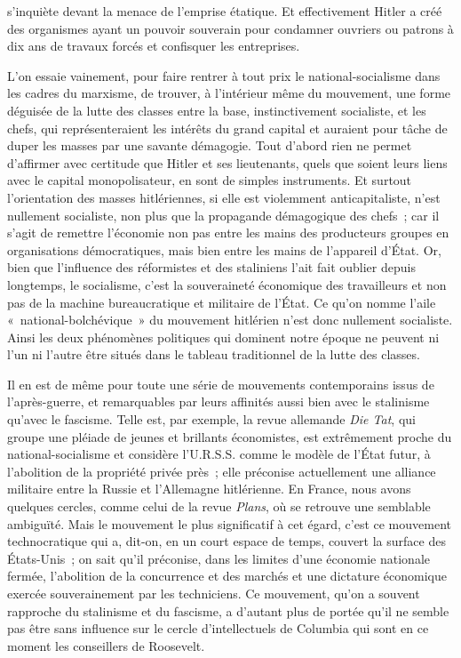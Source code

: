 \documentclass[french,twoside]{book} %
\begin{document}
s'inquiète devant la menace de l'emprise étatique. Et effectivement Hitler a créé des organismes ayant un pouvoir souverain pour condamner ouvriers ou patrons à dix ans de travaux forcés et confisquer les entreprises.\par
L'on essaie vainement, pour faire rentrer à tout prix le national-socialisme dans les cadres du marxisme, de trouver, à l'intérieur même du mouvement, une forme déguisée de la lutte des classes entre la base, instinctivement socialiste, et les chefs, qui représenteraient les intérêts du grand capital et auraient pour tâche de duper les masses par une savante démagogie. Tout d'abord rien ne permet d'affirmer avec certitude que Hitler et ses lieutenants, quels que soient leurs liens avec le capital monopolisateur, en sont de simples instruments. Et surtout l'orientation des masses hitlériennes, si elle est violemment anticapitaliste, n'est nullement socialiste, non plus que la propagande démagogique des chefs ; car il s'agit de remettre l'économie non pas entre les mains des producteurs groupes en organisations démocratiques, mais bien entre les mains de l'appareil d'État. Or, bien que l'influence des réformistes et des staliniens l'ait fait oublier depuis longtemps, le socialisme, c'est la souveraineté économique des travailleurs et non pas de la machine bureaucratique et militaire de l'État. Ce qu'on nomme l'aile « national-bolchévique » du mouvement hitlérien n'est donc nullement socialiste. Ainsi les deux phénomènes politiques qui dominent notre époque ne peuvent ni l'un ni l'autre être situés dans le tableau traditionnel de la lutte des classes.\par
Il en est de même pour toute une série de mouvements contemporains issus de l'après-guerre, et remarquables par leurs affinités aussi bien avec le stalinisme qu'avec le fascisme. Telle est, par exemple, la revue allemande {\itshape Die Tat}, qui groupe une pléiade de jeunes et brillants économistes, est extrêmement proche du national-socialisme et considère l'U.R.S.S. comme le modèle de l'État futur, à l'abolition de la propriété privée près ; elle préconise actuellement une alliance militaire entre la Russie et l'Allemagne hitlérienne. En France, nous avons quelques cercles, comme celui de la revue {\itshape Plans}, où se retrouve une semblable ambiguïté. Mais le mouvement le plus significatif à cet égard, c'est ce mouvement technocratique qui a, dit-on, en un court espace de temps, couvert la surface des États-Unis ; on sait qu'il préconise, dans les limites d'une économie nationale fermée, l'abolition de la concurrence et des marchés et une dictature économique exercée souverainement par les techniciens. Ce mouvement, qu'on a souvent rapproche du stalinisme et du fascisme, a d'autant plus de portée qu'il ne semble pas être sans influence sur le cercle d'intellectuels de Columbia qui sont en ce moment les conseillers de Roosevelt.\par
\end{document}
